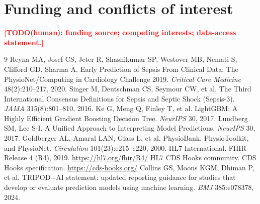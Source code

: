 \documentclass[11pt,a4paper]{article}
\newcommand{\todohuman}[1]{\textcolor{red}{\textbf{[TODO(human): #1]}}}
\begin{document}
\section*{Funding and conflicts of interest}
\todohuman{funding source; competing interests; data-access statement.}


\begin{thebibliography}{9}
 Reyna MA, Josef CS, Jeter R,
Shashikumar SP, Westover MB, Nemati S, Clifford GD, Sharma A. Early Prediction
of Sepsis From Clinical Data: The PhysioNet/Computing in Cardiology Challenge
2019. \emph{Critical Care Medicine} 48(2):210--217, 2020.
 Singer M, Deutschman CS, Seymour CW,
et al. The Third International Consensus Definitions for Sepsis and Septic
Shock (Sepsis-3). \emph{JAMA} 315(8):801--810, 2016.
 Ke G, Meng Q, Finley T, et al. LightGBM: A
Highly Efficient Gradient Boosting Decision Tree. \emph{NeurIPS} 30, 2017.
 Lundberg SM, Lee S-I. A Unified
Approach to Interpreting Model Predictions. \emph{NeurIPS} 30, 2017.
 Goldberger AL, Amaral LAN, Glass
L, et al. PhysioBank, PhysioToolkit, and PhysioNet. \emph{Circulation}
101(23):e215--e220, 2000.
 HL7 International. FHIR Release 4 (R4), 2019.
\url{https://hl7.org/fhir/R4/}
 HL7 CDS Hooks community. CDS Hooks
specification. \url{https://cds-hooks.org/}
 Collins GS, Moons KGM, Dhiman P, et
al. TRIPOD+AI statement: updated reporting guidance for studies that develop or
evaluate prediction models using machine learning. \emph{BMJ} 385:e078378,
2024.
\end{thebibliography}

\end{document}
